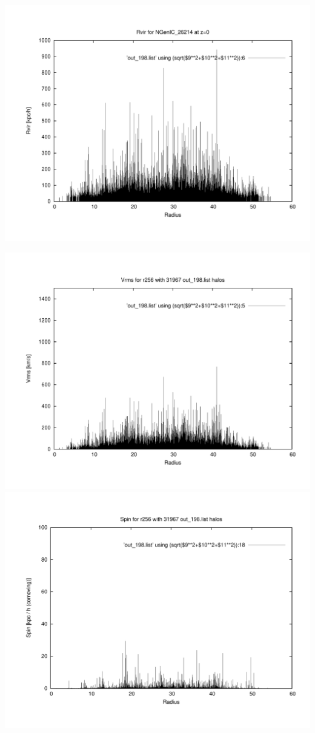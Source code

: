 \includegraphics[scale=0.3]{NGenIC_26214/plot_rvir_z0.pdf}

\includegraphics[scale=0.3]{NGenIC_26214/plot_Vrms_out_198.pdf}
\includegraphics[scale=0.3]{NGenIC_26214/plot_spin_out_198.pdf}

